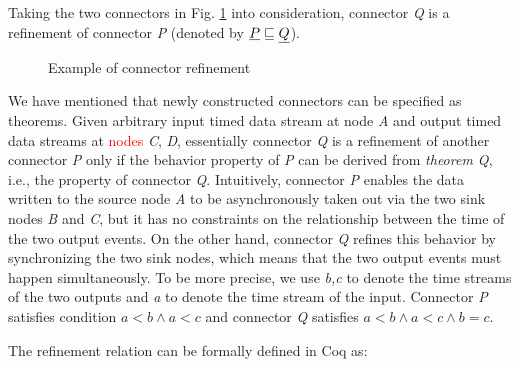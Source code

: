\documentclass{llncs}
\newcommand{\redt}[1]{\textcolor{red}{#1}}
\begin{document}
\begin{example}[Refinement]
\label{ex:refine}
Taking the two connectors in Fig. \ref{refine} into consideration, connector \emph{Q} is a refinement of connector \emph{P} (denoted by $\emph{P} \sqsubseteq \emph{Q}$).
\begin{figure}
\vspace{0cm}
\centering
{}
\caption{Example of connector refinement}
\label{refine}
\end{figure}

We have mentioned that newly constructed connectors can be specified as theorems. Given arbitrary input timed
data stream at node \emph{A} and output timed data streams at \redt{nodes} \emph{C}, \emph{D}, essentially connector
\emph{Q} is a refinement of another connector \emph{P} only if the behavior property of \emph{P} can
be derived from \emph{theorem Q}, i.e., the property of connector \emph{Q}. Intuitively, connector \emph{P} enables the
data written to the source node \emph{A} to be asynchronously taken out via the two sink nodes \emph{B} and \emph{C}, but
it has no constraints on the relationship between the time of the two output events. On the other hand,
connector \emph{Q} refines this behavior by synchronizing the two sink nodes, which means that the two output
events must happen simultaneously. To be more precise, we use \emph{b,c} to denote the time streams of the two outputs
and \emph{a} to denote the time stream of the input. Connector \emph{P} satisfies condition $a<b\wedge a<c$ and
connector \emph{Q} satisfies $a<b\wedge a<c \wedge b=c$.

The refinement relation can be formally defined in Coq as:




\end{example}
\end{document}

